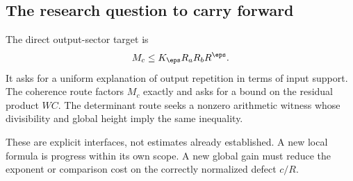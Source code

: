 \subsection{The research question to carry forward}
The direct output-sector target is
\[
 M_c\le K_\eps R_aR_bR^\eps.
\]
It asks for a uniform explanation of output repetition in terms of input support. The coherence route factors $M_c$ exactly and asks for a bound on the residual product $WC$. The determinant route seeks a nonzero arithmetic witness whose divisibility and global height imply the same inequality.

These are explicit interfaces, not estimates already established. A new local formula is progress within its own scope. A new global gain must reduce the exponent or comparison cost on the correctly normalized defect $c/R$.
